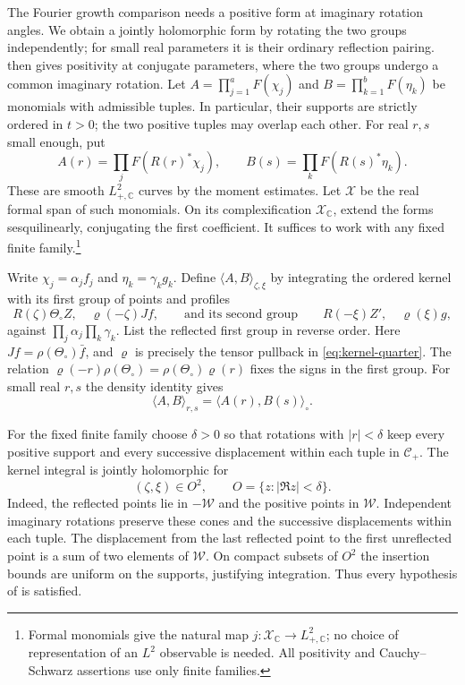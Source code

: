 \documentclass[11pt, letterpaper, reqno]{amsart}
\theoremstyle{definition}
\theoremstyle{remark}
\newcommand{\bbC}{\mathbb{C}}
\newcommand{\calC}{\mathcal{C}}
\newcommand{\calW}{\mathcal{W}}
\newcommand{\calX}{\mathcal{X}}
\begin{document}
The Fourier growth comparison needs a positive form at imaginary
rotation angles. We obtain a jointly holomorphic form by rotating the
two groups independently; for small real parameters it is their
ordinary reflection pairing.  then gives
positivity at conjugate parameters, where the two groups undergo a
common imaginary rotation. Let $A=\prod_{j=1}^aF(\chi_j)$ and
$B=\prod_{k=1}^bF(\eta_k)$ be monomials with admissible tuples.
In particular, their supports are strictly ordered in $t>0$;
the two positive tuples may overlap each other.
For real $r,s$ small enough, put
\begin{equation}
 A(r)=\prod_jF(R(r)^*\chi_j),\qquad
 B(s)=\prod_kF(R(s)^*\eta_k).
\end{equation}
These are smooth $L^2_{+,\bbC}$ curves by the moment estimates.
Let $\calX$ be the real formal span of such monomials. On its
complexification $\calX_\bbC$, extend the forms sesquilinearly,
conjugating the first coefficient.
It suffices to work with any fixed finite family.\footnote{Formal
monomials give the natural map $j:\calX_\bbC\to L^2_{+,\bbC}$;
no choice of representation of an $L^2$ observable is needed. All
positivity and Cauchy--Schwarz assertions use only finite families.}

Write $\chi_j=\alpha_jf_j$ and $\eta_k=\gamma_kg_k$. Define
$\langle A,B\rangle_{\zeta,\xi}$ by integrating the ordered kernel
with its first group of points and profiles
\begin{equation}\label{eq:independent-rotations}
 R(\zeta)\Theta_\circ Z,\quad\varrho(-\zeta)Jf,
 \qquad\text{and its second group}\qquad
 R(-\xi)Z',\quad\varrho(\xi)g,
\end{equation}
against $\prod_j\alpha_j\prod_k\gamma_k$. List the reflected first
group in reverse order. Here $Jf=\rho(\Theta_\circ)\bar f$, and
$\varrho$ is precisely the tensor pullback in
\eqref{eq:kernel-quarter}. The relation
$\varrho(-r)\rho(\Theta_\circ)=\rho(\Theta_\circ)\varrho(r)$
fixes the signs in the first group. For small real $r,s$ the density
identity gives
\begin{equation}
 \langle A,B\rangle_{r,s}=\langle A(r),B(s)\rangle_\circ.
\end{equation}

For the fixed finite family choose $\delta>0$ so that rotations
with $|r|<\delta$ keep every positive support and every successive
displacement within each tuple in $\calC_+$. The kernel integral is
jointly holomorphic for
\begin{equation}
 (\zeta,\xi)\in O^2,\qquad O=\{z:|\Re z|<\delta\}.
\end{equation}
Indeed, the reflected points lie in $-\calW$ and the positive points
in $\calW$. Independent imaginary rotations preserve these cones
and the successive displacements within each tuple. The displacement
from the last reflected point to the first unreflected point is a
sum of two elements of $\calW$. On compact subsets of $O^2$ the insertion bounds are
uniform on the supports, justifying integration. Thus every
hypothesis of  is satisfied.
\end{document}

